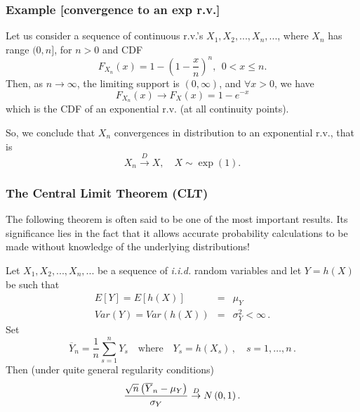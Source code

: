\documentclass[notes=show,smaller,handout]{beamer}\usepackage[]{graphicx}\usepackage[]{color}
\begin{document}
\begin{frame}%
\frametitle{Example [convergence to an exp r.v.]}

\begin{example}
Let us consider a sequence of continuous r.v.'s $X_1, X_2, ..., X_n,...$, where $X_n$ has range $(0, n]$, for $n > 0$ and CDF
$$
F_{X_n} (x) = 1- \left( 1- \frac{x}{n} \right)^n,  \ \ 0<x\leq n.
$$
Then, as $n \to \infty$, the limiting support is $(0,\infty)$, and $\forall x >0$, we have
$$
F_{X_n} (x)  \to F_X(x) = 1 - e^{-x}
$$
which is the CDF of an exponential r.v. (at all continuity points). \vspace{0.5cm}

So, we conclude that $X_n$ convergences in distribution to an exponential r.v., that is
$$
X_n \overset{D}{\rightarrow } X, \quad X \sim \exp(1).
$$

\end{example}


\end{frame}%


\begin{frame}%

\frametitle{The Central Limit Theorem (CLT)}
The following theorem is often said to be one of the most important results. Its significance lies in the fact that it allows accurate probability calculations to be made without knowledge of the underlying distributions!

\begin{theorem} Let $X_{1},X_{2},...,X_{n},...$ be a sequence of \textit{i.i.d.} random variables and let $Y=h(X)$ be such that
\begin{eqnarray*}
E[Y]=E\left[ h(X)\right]  &=&\mu_Y  \\
Var(Y)=Var\left( h(X)\right)  &=&\sigma_Y ^{2}<\infty\,.
\end{eqnarray*}%
Set
$$
\overline{Y}_n=\frac{1}{n}\sum_{s=1}^nY_s\quad\text{where}\quad Y_s=h(X_s)\,,\quad s=1,\ldots,n\,.
$$
Then (under quite general regularity conditions)%
\begin{equation*}
\frac{\sqrt{n}\left( \overline{Y}_{n}-\mu_Y \right) }{\sigma_Y }\overset{D}{%
\rightarrow }N\left( 0,1\right).
\end{equation*}
\end{theorem}
\end{frame}%
\end{document}
